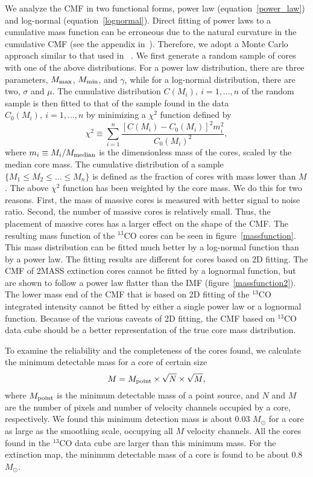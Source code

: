 \documentclass[12pt,preprint]{aastex}
\begin{document}
We analyze the CMF in two functional forms, power law (equation~\ref{power_law}) and log-normal (equation~\ref{lognormal}).
Direct fitting of power laws to a cumulative mass function can be erroneous due to the natural curvature in the cumulative CMF
(see the appendix in~\cite{core_mass_function}).
Therefore, we adopt a Monte Carlo approach similar to that used in ~\cite{core_mass_function}.
We first generate a random sample of cores with one of the above distributions. For a power law distribution, there are three parameters,
$M_{\rm max}$, $M_{\rm min}$, and $\gamma$, while for a log-normal distribution, there are two, $\sigma$ and $\mu$.
The cumulative distribution $C(M_i),\ i=1,...,n$ of the random sample is then fitted to that of the sample found in the data
$C_0(M_i),\ i=1,...,n$ by minimizing a $\chi^2$ function defined by
\begin{equation}
\chi^2\equiv \sum_{i=1}^{n}\frac{[C(M_i)-C_0(M_i)]^2 m_i^2}{C_0(M_i)^2},
\end{equation}
where $m_i\equiv M_i/M_{\rm median}$ is the dimensionless mass of the cores, scaled by the median core mass. The cumulative distribution of a sample $\{M_1\le M_2\le ...\le M_n\}$ is defined as the
fraction of cores with mass lower than $M$.
The above $\chi^2$ function has been weighted by the core mass. We do this for two reasons.
First, the mass of massive cores is
measured with better signal to noise ratio.
Second, the number of massive cores is relatively small.
Thus, the placement of massive cores has a larger effect on the shape of the CMF.
The resulting mass function of the $^{13}$CO cores can be seen in figure~\ref{massfunction}.
This mass distribution can be fitted much better by a log-normal function than by a power law.
The fitting results are different for cores based on 2D fitting. The CMF of
2MASS extinction cores cannot be fitted by a lognormal function, but are shown to follow a
power law flatter than the IMF (figure~\ref{massfunction2}). The lower mass end of the CMF that is based on 2D fitting of the $^{13}$CO
integrated intensity cannot be  fitted by either a single power law or a lognormal function.
Because of the various caveats of 2D fitting, the CMF based on $^{13}$CO data cube should be
a better representation of the true core mass distribution.

To examine the reliability and the completeness of the cores found, we calculate the minimum detectable mass for a core of certain size \citep{core_mass_function}
\begin{equation}
M=M_{\rm point}\times\sqrt{N}\times\sqrt{M},
\end{equation}
where $M_{\rm point}$ is the minimum detectable mass of a point source, and $N$ and $M$ are the number of pixels and number of velocity channels
occupied by a core, respectively.
We found this minimum detection mass is about 0.03 $M_{\odot}$ for a core as large as the smoothing scale,
occupying all $M$ velocity channels. All the cores found in the $^{13}$CO data cube are larger than this minimum mass.
For the extinction map, the minimum detectable mass of a core is found to be about 0.8 $M_{\odot}$.
\end{document}
